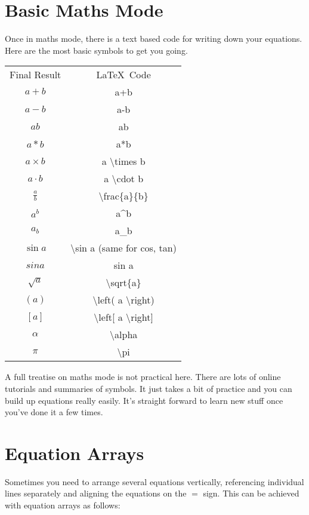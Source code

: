 

\section{Basic Maths Mode}
Once in maths mode, there is a text based code for writing down your equations.  Here are the most basic symbols to get you going.
\begin{center}
\begin{tabular}{cc}
\toprule
Final Result & \LaTeX\ Code \\
\cmidrule(){1-2}
$a+b$ & a+b \\
$a-b$ & a-b \\
$ab$ & ab \\
$a*b$ & a*b \\
$a \times b$ & a {\textbackslash}times b \\
$a \cdot b$ & a {\textbackslash}cdot b \\
$\frac{a}{b}$ & {\textbackslash}frac\{a\}\{b\} \\ 
$a^b$ & a\textasciicircum{}b \\
$a_b$ & a\_b \\
$\sin a$ & {\textbackslash}sin a  (same for cos, tan)\\
$ sin a$ & sin a \\
$\sqrt{a}$ & {\textbackslash}sqrt\{a\} \\
$\left( a \right) $ & {\textbackslash}left( a {\textbackslash}right)\\ 
$\left[ a \right]$ & {\textbackslash}left[ a {\textbackslash}right]\\ 
$\alpha$ & {\textbackslash}alpha \\
$\pi$ & {\textbackslash}pi \\
\bottomrule
\end{tabular}
\end{center}

A full treatise on maths mode is not practical here. There are lots of online tutorials and summaries of symbols. It just takes a bit of practice and you can build up equations really easily. It's straight forward to learn new stuff once you've done it a few times.

\pagebreak
\section{Equation Arrays}
Sometimes you need to arrange several equations vertically, referencing individual lines separately and aligning the equations on the $=$ sign. This can be achieved with equation arrays as follows:

